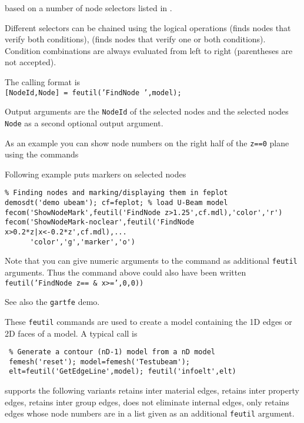  based on a number of node selectors listed in . 

Different selectors can be chained using the logical operations \ts{\&} (finds nodes that verify both conditions), \ts{|} (finds nodes that verify one or both conditions). Condition combinations are always evaluated from left to right (parentheses are not accepted).

The calling format is\\
{\tt [NodeId,Node] = feutil('FindNode ',model);} 

\noindent Output arguments are the {\tt NodeId} of the selected nodes and the selected nodes {\tt Node} as a second optional output argument. 

\noindent As an example you can show node numbers on the right half of the {\tt z==0} plane using the commands


Following example puts markers on selected nodes
\begin{verbatim}
% Finding nodes and marking/displaying them in feplot
demosdt('demo ubeam'); cf=feplot; % load U-Beam model
fecom('ShowNodeMark',feutil('FindNode z>1.25',cf.mdl),'color','r')
fecom('ShowNodeMark-noclear',feutil('FindNode x>0.2*z|x<-0.2*z',cf.mdl),...
      'color','g','marker','o')
\end{verbatim}%

Note that you can give numeric arguments to the command as additional {\tt feutil} arguments. Thus the command above could also have been written 
{\tt feutil('FindNode z== \& x>=',0,0))}

 See also the {\tt gartfe} demo.



These {\tt feutil} commands are used to create a model containing the 1D edges or 2D faces of a model. A typical call is

\begin{verbatim}
 % Generate a contour (nD-1) model from a nD model
 femesh('reset'); model=femesh('Testubeam');
 elt=feutil('GetEdgeLine',model); feutil('infoelt',elt)
\end{verbatim}%

 supports the following variants  retains inter material edges,  retains inter property edges,  retains inter group edges,  does not eliminate internal edges,  only retains edges whose node numbers are in a list given as an additional {\tt feutil} argument.

